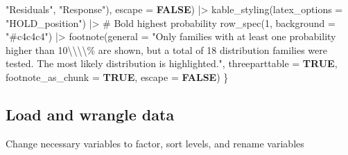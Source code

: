 \documentclass[
  bookmarksnumbered]{article}
\newenvironment{Shaded}{\begin{snugshade}}{\end{snugshade}}
\newcommand{\AttributeTok}[1]{\textcolor[rgb]{0.80,0.80,0.80}{#1}}
\newcommand{\CommentTok}[1]{\textcolor[rgb]{0.50,0.62,0.50}{#1}}
\newcommand{\ConstantTok}[1]{\textcolor[rgb]{0.86,0.64,0.64}{\textbf{#1}}}
\newcommand{\DecValTok}[1]{\textcolor[rgb]{0.86,0.86,0.80}{#1}}
\newcommand{\FunctionTok}[1]{\textcolor[rgb]{0.94,0.94,0.56}{#1}}
\newcommand{\NormalTok}[1]{\textcolor[rgb]{0.80,0.80,0.80}{#1}}
\newcommand{\SpecialCharTok}[1]{\textcolor[rgb]{0.86,0.64,0.64}{#1}}
\newcommand{\StringTok}[1]{\textcolor[rgb]{0.80,0.58,0.58}{#1}}
\begin{document}
\begin{Shaded}
\begin{Highlighting}[]
                      \StringTok{"Residuals"}\NormalTok{, }
                      \StringTok{"Response"}\NormalTok{),}
        \AttributeTok{escape =} \ConstantTok{FALSE}\NormalTok{) }\SpecialCharTok{|\textgreater{}} 
  \FunctionTok{kable\_styling}\NormalTok{(}\AttributeTok{latex\_options =} \StringTok{"HOLD\_position"}\NormalTok{) }\SpecialCharTok{|\textgreater{}}
  \CommentTok{\# Bold highest probability}
  \FunctionTok{row\_spec}\NormalTok{(}\DecValTok{1}\NormalTok{, }\AttributeTok{background =} \StringTok{"\#c4c4c4"}\NormalTok{) }\SpecialCharTok{|\textgreater{}}
  \FunctionTok{footnote}\NormalTok{(}\AttributeTok{general =} \StringTok{"Only families with at least one probability higher than }
\StringTok{  10}\SpecialCharTok{\textbackslash{}\textbackslash{}\textbackslash{}\textbackslash{}}\StringTok{\% are shown, but a total of 18 distribution families were tested.}
\StringTok{  The most likely distribution is highlighted."}\NormalTok{, }
           \AttributeTok{threeparttable =} \ConstantTok{TRUE}\NormalTok{,}
           \AttributeTok{footnote\_as\_chunk =} \ConstantTok{TRUE}\NormalTok{,}
           \AttributeTok{escape =} \ConstantTok{FALSE}\NormalTok{)}
\NormalTok{\}}
\end{Highlighting}
\end{Shaded}

\hypertarget{load-and-wrangle-data}{%
\subsection{Load and wrangle data}\label{load-and-wrangle-data}}

Change necessary variables to factor, sort levels, and rename variables
\end{document}
